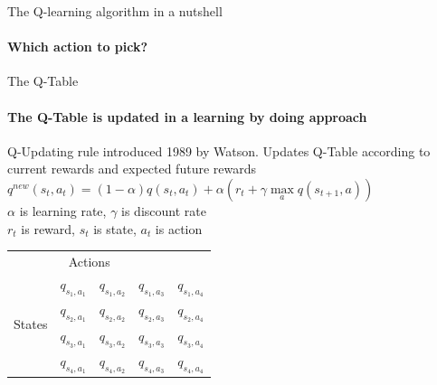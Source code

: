 \documentclass[color=usenames,dvipsnames]{beamer}
\begin{document}
\begin{frame}{The Q-learning algorithm in a nutshell}
\framesubtitle{Which action to pick?}
\end{frame}


\begin{frame}{The Q-Table}
\framesubtitle{The Q-Table is updated in a learning by doing approach}

Q-Updating rule introduced 1989 by Watson. Updates Q-Table according to current rewards and expected future rewards\\

$q^{new}(s_t,a_t)=(1-\alpha)q(s_t,a_t) + \alpha (r_t + \gamma \max\limits_{a} q(s_{t+1},a))$\\

$\alpha$ is learning rate, $\gamma$ is discount rate\\
$r_t$ is reward, $s_t$ is state, $a_t$ is action\\

\begin{table}
	\begin{tabular}{lllll}
		 \multicolumn{4}{c}{Actions}\\
\multirow{4}{*}{States}		& $q_{s_1,a_1}$ & $q_{s_1,a_2}$ & $q_{s_1,a_3}$  & $q_{s_1,a_4}$\\
							& $q_{s_2,a_1}$ & $q_{s_2,a_2}$ & $q_{s_2,a_3}$  & $q_{s_2,a_4}$\\
							& $q_{s_3,a_1}$ & $q_{s_3,a_2}$ & $q_{s_3,a_3}$  & $q_{s_3,a_4}$\\
							& $q_{s_4,a_1}$ & $q_{s_4,a_2}$ & $q_{s_4,a_3}$  & $q_{s_4,a_4}$\\
	\end{tabular}
\end{table}

\end{frame}
\end{document}
